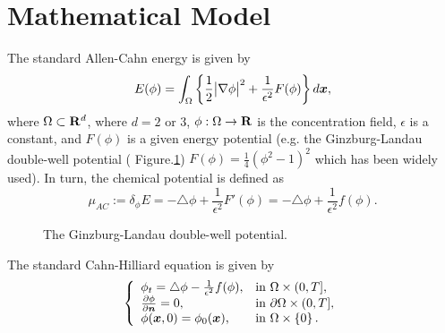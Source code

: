 \documentclass[cmbright]{mymmaauth}
\newcommand{\abs}[1]{\big| {#1} \big| }
\def\bvec#1{\ensuremath{\mathchoice
                     {\mbox{\boldmath$\displaystyle\mathbf{#1}$}}
                     {\mbox{\boldmath$\textstyle\mathbf{#1}$}}
                     {\mbox{\boldmath$\scriptstyle\mathbf{#1}$}}
                     {\mbox{\boldmath$\scriptscriptstyle\mathbf{#1}$}}}}
\def\bvec#1{\ensuremath{\mathchoice
                     {\mbox{\boldmath$\displaystyle#1$}}
                     {\mbox{\boldmath$\textstyle#1$}}
                     {\mbox{\boldmath$\scriptstyle#1$}}
                     {\mbox{\boldmath$\scriptscriptstyle#1$}}}}
\def\lap{{\triangle}}
\def\x{\mbox{\boldmath $x$}}
\begin{document}
\section{Mathematical Model}
\label{intro-section}
The standard Allen-Cahn energy is given by 
\begin{equation}\label{energy-CH}
E(\phi) =\int_\Omega \nest{\frac{1}{2} \abs{\grad\phi}^2+\frac{1}{\epsilon^2}F(\phi)}d\bvec{x}, 
\end{equation} 
where $\Omega\subset {\bf R}^d$, where $d = 2$ or 3, 
$\phi:\Omega\rightarrow {\bf R}$ is the concentration field,  $\epsilon$ is a constant, and $F(\phi)$ is a given energy potential
 (e.g. the Ginzburg-Landau double-well potential ( Figure.\ref{fig:GLpotential}) $F(\phi)=\frac{1}{4}(\phi^2-1)^2$ which has been widely used).
In turn, the chemical potential is defined as
\begin{equation}\label{chem-pot}
\mu_{AC} := \delta_\phi E =-\lap\phi+\frac{1}{\epsilon^2}F'(\phi)=-\lap \phi+\frac{1}{\epsilon^2}f(\phi). 
\end{equation}
\begin{figure}[!htp]
\begin{center}
\end{center}
\caption{The Ginzburg-Landau double-well potential.}\label{fig:GLpotential}
\end{figure}

The standard Cahn-Hilliard equation is given by 
\begin{equation}\label{eqn:stdch} \left\{ \begin{array}{ll}
\phi_t =  \lap \phi-\frac{1}{\epsilon^2} f(\phi),&  \text{in}~ \Omega \times (0, T], \\
  \frac{\partial \phi}{\partial \bvec{n}} = 0, & \text{in}~ \partial\Omega \times  (0, T], \\
\phi(\bvec{x},0) = \phi_0(\bvec{x}), &  \text{in}~ \Omega \times \nest{0}. \\
\end{array} \right. 
\end{equation}
\end{document}
